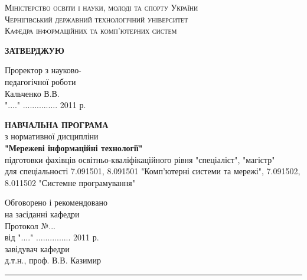 \documentclass[a4paper,14pt,ukrainian]{extarticle}
\begin{document}
\setlength{\parindent}{1.27cm}
\setlength{\parskip}{0pt}
\pagestyle{empty}




\begin{titlepage}
\newpage

\begin{center}
\normalfont\scshape{Міністерство освіти і науки, молоді та спорту України} \\
\normalfont\scshape{Чернігівський державний технологічний університет} \\
\normalfont\scshape{Кафедра інформаційних та комп'ютерних систем} \\
\end{center}

\vspace{2em}

\begin{flushright}
{\bf \MakeUppercase{затверджую}}
\end{flushright}

\vspace{1em}

\begin{flushright}
Проректор з науково-\\
педагогічної роботи \\
\vspace{1em}
Кальченко В.В. \\
\vspace{1em}
"...." ............... 2011 р.
\end{flushright}

\vspace{4em}

\begin{center}
{\large \MakeUppercase{\bf {\textsf{навчальна програма}}}} \\
з нормативної дисципліни \\
{\bf "Мережеві інформаційні технології"} \\
підготовки фахівців освітньо-кваліфікаційного рівня "спеціаліст", "магістр" \\
для спеціальності 7.091501, 8.091501 "Комп’ютерні системи та мережі",
7.091502, 8.011502 "Системне програмування"
\end{center}

\vspace{4em}

\begin{flushright}
Обговорено і рекомендовано \\
на засіданні кафедри \\
Протокол №... \\
від "...." ............... 2011 р. \\
завідувач кафедри \\
д.т.н., проф. В.В. Казимир \\
\rule{5cm}{0.5pt} \\
\end{flushright}


\end{titlepage}
\end{document}
